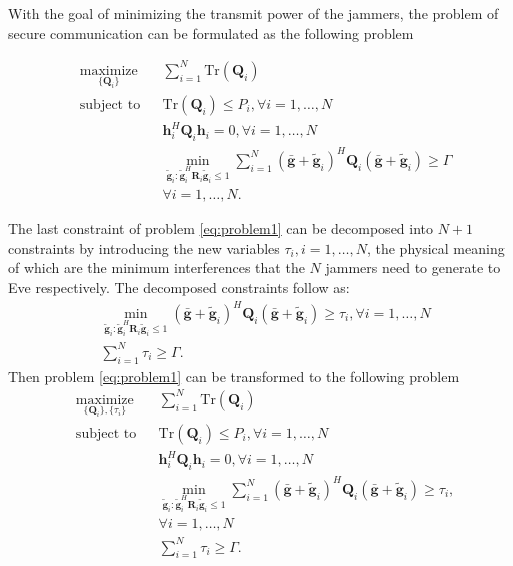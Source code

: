 \documentclass[conference]{IEEEtran}
\begin{document}
With the goal of minimizing the transmit power of the jammers, the problem of secure communication can be formulated as the following problem

\begin{equation}
\begin{aligned} \label{eq:problem1}
& \underset{\{\mathbf{Q}_i\}}{\text{maximize}}
& & \sum_{i = 1}^{N}\mathrm{Tr}(\mathbf{Q}_i) \\
& \text{subject to}
& & \mathrm{Tr}(\mathbf{Q}_i) \leq P_i, \forall i = 1, \ldots, N\\
&&& \mathbf{h}_i^H \mathbf{Q}_i \mathbf{h}_i= 0, \forall i = 1,\ldots,N\\
&&& \min_{\tilde{\mathbf{g}}_i: \tilde{\mathbf{g}}_i^H \mathbf{R}_i\tilde{\mathbf{g}}_i \leq 1}\sum_{i=1}^{N}(\bar{\mathbf{g}}+\tilde{\mathbf{g}}_i)^H\mathbf{Q}_i(\bar{\mathbf{g}}+\tilde{\mathbf{g}}_i) \geq  \Gamma\\
&&& \forall i = 1, \ldots, N.
\end{aligned}
\end{equation}


The last constraint of problem \eqref{eq:problem1} can be decomposed into $N+1$ constraints by introducing the new variables $\tau_i, i =1,\ldots,N$, the physical meaning of which are the minimum interferences that the $N$ jammers need to generate to Eve respectively. The decomposed constraints follow as:
\begin{eqnarray}
&\underset{\tilde{\mathbf{g}}_i: \tilde{\mathbf{g}}_i^H \mathbf{R}_i\tilde{\mathbf{g}}_i \leq 1}\min(\bar{\mathbf{g}}+\tilde{\mathbf{g}}_i)^H\mathbf{Q}_i(\bar{\mathbf{g}}+\tilde{\mathbf{g}}_i) \geq  \tau_i, \forall i = 1,\ldots,N\label{eq:artificial noise constraint decomposed}\nonumber\\
&\sum_{i =1}^{N}\tau_i \geq \Gamma.
\end{eqnarray}
Then problem \eqref{eq:problem1} can be transformed to the following problem
\begin{equation}
\begin{aligned} \label{eq:problem2}
& \underset{\{\mathbf{Q}_i\},\{\tau_i\}}{\text{maximize}}
& & \sum_{i = 1}^{N}\mathrm{Tr}(\mathbf{Q}_i) \\
& \text{subject to}
& & \mathrm{Tr}(\mathbf{Q}_i) \leq P_i, \forall i = 1, \ldots, N\\
&&& \mathbf{h}_i^H \mathbf{Q}_i \mathbf{h}_i= 0, \forall i = 1,\ldots,N\\
&&& \min_{\tilde{\mathbf{g}}_i: \tilde{\mathbf{g}}_i^H \mathbf{R}_i\tilde{\mathbf{g}}_i \leq 1}\sum_{i=1}^{N}(\bar{\mathbf{g}}+\tilde{\mathbf{g}}_i)^H\mathbf{Q}_i(\bar{\mathbf{g}}+\tilde{\mathbf{g}}_i) \geq  \tau_i,\\
&&&\forall i = 1,\ldots,N\\
&&&\sum_{i =1}^{N}\tau_i \geq \Gamma.
\end{aligned}
\end{equation}
\end{document}
